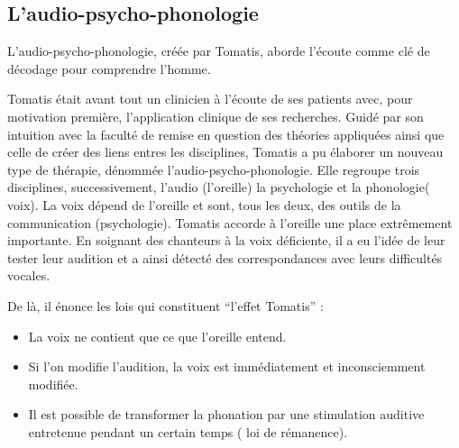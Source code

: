 \subsection{L'audio-psycho-phonologie}

L'audio-psycho-phonologie, créée par Tomatis, aborde l'écoute comme
clé de décodage pour comprendre l'homme.

Tomatis était avant tout un clinicien à l'écoute de ses patients avec,
pour motivation première, l'application clinique de ses recherches.
Guidé par son intuition avec la faculté de remise en question des
théories appliquées ainsi que celle de créer des liens entres les
disciplines, Tomatis a pu élaborer un nouveau type de thérapie, dénommée
l'audio-psycho-phonologie. Elle regroupe trois disciplines, successivement,
l'audio (l'oreille) la psychologie et la phonologie( voix). La voix
dépend de l'oreille et sont, tous les deux, des outils de la communication
(psychologie). 
Tomatis accorde à l'oreille une place extrêmement importante. En soignant
des chanteurs à la voix déficiente, il a eu l'idée de leur tester
leur audition et a ainsi détecté des correspondances avec leurs difficultés
vocales. 

De là, il énonce les lois qui constituent ``l'effet Tomatis'' : 
\begin{itemize}
\item La voix ne contient que ce que l'oreille entend.
\item Si l'on modifie l'audition, la voix est immédiatement et inconsciemment
modifiée.
\item Il est possible de transformer la phonation par une stimulation auditive
entretenue pendant un certain temps ( loi de rémanence).
\end{itemize}

